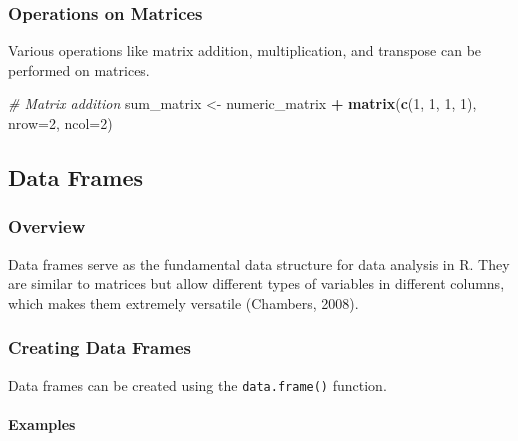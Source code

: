 \documentclass[
  b5paper]{book}
\newenvironment{Shaded}{\begin{snugshade}}{\end{snugshade}}
\newcommand{\AttributeTok}[1]{\textcolor[rgb]{0.13,0.29,0.53}{#1}}
\newcommand{\CommentTok}[1]{\textcolor[rgb]{0.56,0.35,0.01}{\textit{#1}}}
\newcommand{\DecValTok}[1]{\textcolor[rgb]{0.00,0.00,0.81}{#1}}
\newcommand{\FunctionTok}[1]{\textcolor[rgb]{0.13,0.29,0.53}{\textbf{#1}}}
\newcommand{\NormalTok}[1]{#1}
\newcommand{\OtherTok}[1]{\textcolor[rgb]{0.56,0.35,0.01}{#1}}
\newcommand{\SpecialCharTok}[1]{\textcolor[rgb]{0.81,0.36,0.00}{\textbf{#1}}}
\begin{document}
\hypertarget{operations-on-matrices}{%
\subsubsection*{Operations on Matrices}\label{operations-on-matrices}}

Various operations like matrix addition, multiplication, and transpose can be performed on matrices.

\begin{Shaded}
\begin{Highlighting}[]
\CommentTok{\# Matrix addition}
\NormalTok{sum\_matrix }\OtherTok{\textless{}{-}}\NormalTok{ numeric\_matrix }\SpecialCharTok{+} \FunctionTok{matrix}\NormalTok{(}\FunctionTok{c}\NormalTok{(}\DecValTok{1}\NormalTok{, }\DecValTok{1}\NormalTok{, }\DecValTok{1}\NormalTok{, }\DecValTok{1}\NormalTok{), }\AttributeTok{nrow=}\DecValTok{2}\NormalTok{, }\AttributeTok{ncol=}\DecValTok{2}\NormalTok{)}
\end{Highlighting}
\end{Shaded}

\hypertarget{data-frames}{%
\subsection*{Data Frames}\label{data-frames}}

\hypertarget{overview-4}{%
\subsubsection*{Overview}\label{overview-4}}

Data frames serve as the fundamental data structure for data analysis in R. They are similar to matrices but allow different types of variables in different columns, which makes them extremely versatile (Chambers, 2008).

\hypertarget{creating-data-frames}{%
\subsubsection*{Creating Data Frames}\label{creating-data-frames}}

Data frames can be created using the \texttt{data.frame()} function.

\hypertarget{examples-4}{%
\paragraph*{Examples}\label{examples-4}}
\end{document}
